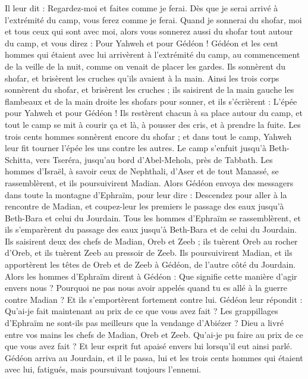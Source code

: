 \begin{multicols}{2}
Il leur dit : Regardez-moi et faites comme je ferai. Dès que je serai arrivé à l’extrémité du camp, vous ferez comme je ferai.
Quand je sonnerai du shofar, moi et tous ceux qui sont avec moi, alors vous sonnerez aussi du shofar tout autour du camp, et vous direz : Pour Yahweh et pour Gédéon !
Gédéon et les cent hommes qui étaient avec lui arrivèrent à l’extrémité du camp, au commencement de la veille de la nuit, comme on venait de placer les gardes. Ils sonnèrent du shofar, et  brisèrent les cruches qu'ils avaient à la main.
Ainsi les trois corps sonnèrent du shofar, et brisèrent les cruches ; ils saisirent de la main gauche les flambeaux et de la main droite les shofars pour sonner, et ils s’écrièrent : L'épée pour Yahweh et pour Gédéon !
Ils restèrent chacun à sa place autour du camp, et tout le camp se mit à courir ça et là, à pousser des cris, et à prendre la fuite.
Les trois cents hommes sonnèrent encore du shofar ; et dans tout le camp, Yahweh leur fit tourner l'épée les uns contre les autres. Le camp s'enfuit jusqu'à Beth-Schitta, vers Tseréra, jusqu'au bord d'Abel-Mehola, près de Tabbath.
Les hommes d'Israël, à savoir ceux de Nephthali, d'Aser et de tout Manassé, se rassemblèrent, et ils poursuivirent Madian.
Alors Gédéon envoya des messagers dans toute la montagne d'Ephraïm, pour leur dire : Descendez pour aller à la rencontre de Madian, et coupez-leur les premiers le passage des eaux jusqu'à Beth-Bara et celui du Jourdain. Tous les hommes d'Ephraïm se rassemblèrent, et ils s’emparèrent du passage des eaux jusqu’à Beth-Bara et de celui du Jourdain.
Ils saisirent deux des chefs de Madian, Oreb et Zeeb ; ils tuèrent Oreb au rocher d’Oreb, et ils tuèrent Zeeb au pressoir de Zeeb. Ils poursuivirent Madian, et ils apportèrent les têtes de Oreb et de Zeeb à Gédéon, de l’autre côté du Jourdain.
\VerseOne{}Alors les hommes d'Ephraïm dirent à Gédéon : Que signifie cette manière d’agir envers nous ? Pourquoi ne pas nous avoir appelés quand tu es allé à la guerre contre Madian ? Et ils s'emportèrent fortement contre lui.
Gédéon leur répondit : Qu'ai-je fait maintenant au prix de ce que vous avez fait ? Les grappillages d'Ephraïm ne sont-ils pas meilleurs que la vendange d'Abiézer ?
Dieu a livré entre vos mains les chefs de Madian, Oreb et Zeeb. Qu'ai-je pu faire au prix de ce que vous avez fait ? Et leur esprit fut apaisé envers lui lorsqu’il eut ainsi parlé.
Gédéon arriva au Jourdain, et il le passa, lui et les trois cents hommes qui étaient avec lui, fatigués, mais poursuivant toujours l'ennemi.

\end{multicols}
